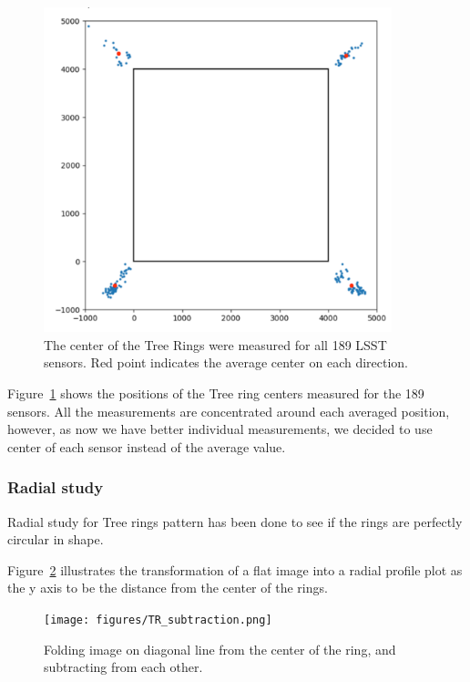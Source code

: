 \begin{figure}
\begin{centering}
\includegraphics[width=0.9\textwidth]{figures/TR_centers.png}
\end{centering}
\caption{The center of the Tree Rings were measured for all 189 LSST sensors. Red point indicates the average center on each direction.}
\label{fig:tree_ring_center}
\end{figure}
Figure~\ref{fig:tree_ring_center} shows the positions of the Tree ring centers measured for the 189 sensors. All the measurements are concentrated around each averaged position, however, as now we have better individual measurements, we decided to use center of each sensor instead of the average value. 


\subsubsection{Radial study}
Radial study for Tree rings pattern has been done to see if the rings are perfectly circular in shape. 

Figure~\ref{fig:tree-ring-radial-transform} illustrates the transformation of a flat image into a radial profile plot as the y axis to be the distance from the center of the rings. 

\begin{figure}
\centering
\texttt{[image: figures/TR\_subtraction.png]}
\caption{Folding image on diagonal line from the center of the ring, and subtracting from each other.}
\label{fig:tree-ring-radial-transform}
\end{figure}

